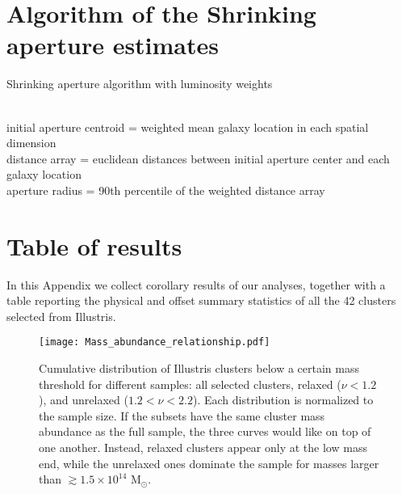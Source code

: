 \documentclass[usenatbib]{mn2e}
\begin{document}
{


\appendix
\section{Algorithm of the Shrinking aperture estimates}
\label{app:shrink_apert}
\begin{algorithm}
	\caption{Shrinking aperture algorithm with luminosity weights}
	 \hrulefill \\

	 initial aperture centroid = weighted mean galaxy location in each spatial dimension\\
 	distance array = euclidean distances between initial aperture center and each galaxy
	location \\
 	aperture radius = 90th percentile of the weighted distance array\\ 
	   \hrulefill
\end{algorithm}


\section{Table of results}
\label{app:table_of_results}
In this Appendix we collect corollary results of our analyses, together with a table reporting the physical and offset summary statistics of all the 42 clusters selected from Illustris.



\begin{figure}
	\begin{center}
	\texttt{[image: Mass\_abundance\_relationship.pdf]}
	\caption{Cumulative distribution of Illustris clusters below a certain mass threshold
		for different samples: all selected clusters, relaxed ($\nu < 1.2$), and unrelaxed ($1.2 < \nu < 2.2$).
		Each distribution is normalized to the sample size.
		If the subsets have the same cluster mass abundance as the full sample,
		the three curves would like on top of one another. Instead, relaxed clusters appear only at the low mass end, while the unrelaxed ones dominate the sample for masses larger than $ \gtrsim 1.5 \times 10^{14}$ M$_\odot$.
		\label{fig:mass_abundance_distribution}
	}
\end{center}
\end{figure}
 


}
\end{document}
